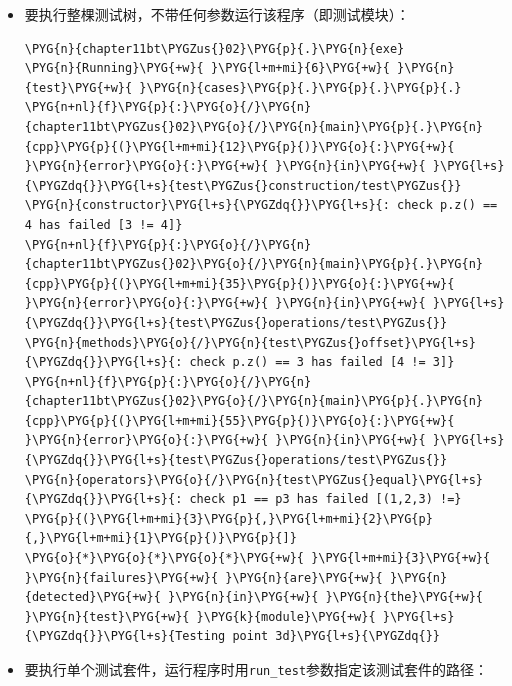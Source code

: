 \begin{itemize}
\item 要执行整棵测试树，不带任何参数运行该程序（即测试模块）：



\begin{codeblockbg}
\begin{Verbatim}[commandchars=\\\{\},breaklines=true,breakanywhere=true,fontsize=\codefont,xleftmargin=17bp]
\PYG{n}{chapter11bt\PYGZus{}02}\PYG{p}{.}\PYG{n}{exe}
\PYG{n}{Running}\PYG{+w}{ }\PYG{l+m+mi}{6}\PYG{+w}{ }\PYG{n}{test}\PYG{+w}{ }\PYG{n}{cases}\PYG{p}{.}\PYG{p}{.}\PYG{p}{.}
\PYG{n+nl}{f}\PYG{p}{:}\PYG{o}{/}\PYG{n}{chapter11bt\PYGZus{}02}\PYG{o}{/}\PYG{n}{main}\PYG{p}{.}\PYG{n}{cpp}\PYG{p}{(}\PYG{l+m+mi}{12}\PYG{p}{)}\PYG{o}{:}\PYG{+w}{ }\PYG{n}{error}\PYG{o}{:}\PYG{+w}{ }\PYG{n}{in}\PYG{+w}{ }\PYG{l+s}{\PYGZdq{}}\PYG{l+s}{test\PYGZus{}construction/test\PYGZus{}}
\PYG{n}{constructor}\PYG{l+s}{\PYGZdq{}}\PYG{l+s}{: check p.z() == 4 has failed [3 != 4]}
\PYG{n+nl}{f}\PYG{p}{:}\PYG{o}{/}\PYG{n}{chapter11bt\PYGZus{}02}\PYG{o}{/}\PYG{n}{main}\PYG{p}{.}\PYG{n}{cpp}\PYG{p}{(}\PYG{l+m+mi}{35}\PYG{p}{)}\PYG{o}{:}\PYG{+w}{ }\PYG{n}{error}\PYG{o}{:}\PYG{+w}{ }\PYG{n}{in}\PYG{+w}{ }\PYG{l+s}{\PYGZdq{}}\PYG{l+s}{test\PYGZus{}operations/test\PYGZus{}}
\PYG{n}{methods}\PYG{o}{/}\PYG{n}{test\PYGZus{}offset}\PYG{l+s}{\PYGZdq{}}\PYG{l+s}{: check p.z() == 3 has failed [4 != 3]}
\PYG{n+nl}{f}\PYG{p}{:}\PYG{o}{/}\PYG{n}{chapter11bt\PYGZus{}02}\PYG{o}{/}\PYG{n}{main}\PYG{p}{.}\PYG{n}{cpp}\PYG{p}{(}\PYG{l+m+mi}{55}\PYG{p}{)}\PYG{o}{:}\PYG{+w}{ }\PYG{n}{error}\PYG{o}{:}\PYG{+w}{ }\PYG{n}{in}\PYG{+w}{ }\PYG{l+s}{\PYGZdq{}}\PYG{l+s}{test\PYGZus{}operations/test\PYGZus{}}
\PYG{n}{operators}\PYG{o}{/}\PYG{n}{test\PYGZus{}equal}\PYG{l+s}{\PYGZdq{}}\PYG{l+s}{: check p1 == p3 has failed [(1,2,3) !=}
\PYG{p}{(}\PYG{l+m+mi}{3}\PYG{p}{,}\PYG{l+m+mi}{2}\PYG{p}{,}\PYG{l+m+mi}{1}\PYG{p}{)}\PYG{p}{]}
\PYG{o}{*}\PYG{o}{*}\PYG{o}{*}\PYG{+w}{ }\PYG{l+m+mi}{3}\PYG{+w}{ }\PYG{n}{failures}\PYG{+w}{ }\PYG{n}{are}\PYG{+w}{ }\PYG{n}{detected}\PYG{+w}{ }\PYG{n}{in}\PYG{+w}{ }\PYG{n}{the}\PYG{+w}{ }\PYG{n}{test}\PYG{+w}{ }\PYG{k}{module}\PYG{+w}{ }\PYG{l+s}{\PYGZdq{}}\PYG{l+s}{Testing point 3d}\PYG{l+s}{\PYGZdq{}}
\end{Verbatim}
\end{codeblockbg}



\item 要执行单个测试套件，运行程序时用\texttt{run\_\allowbreak{}test}参数指定该测试套件的路径：



\end{itemize}
